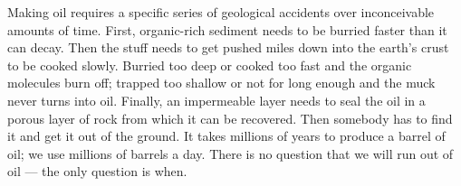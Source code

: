 Making oil requires a specific series of geological accidents over
inconceivable amounts of time. First, organic-rich sediment needs to
be burried faster than it can decay. Then the stuff needs to get pushed
miles down into the earth's crust to be cooked slowly. Burried too
deep or cooked too fast and the organic molecules burn off;
trapped too shallow or not for long enough and the muck never
turns into oil. Finally, an impermeable layer needs to seal the
oil in a porous layer of rock from which it can be recovered. Then
somebody has to find it and get it out of the ground. It takes
millions of years to produce a barrel of oil; we use millions of
barrels a day. There is no question that we will run out of oil ---
the only question is when.

